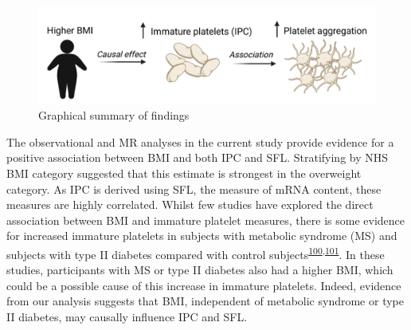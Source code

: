 \documentclass[11pt,twoside]{bristolthesis}
\begin{document}
\begin{figure}
\includegraphics[width=0.9\linewidth]{figure/BMI_platelets/Visual_abstract} \caption{Graphical summary of findings}\label{fig:BMI-platelet-cartoon}
\end{figure}
The observational and MR analyses in the current study provide evidence for a positive association between BMI and both IPC and SFL. Stratifying by NHS BMI category suggested that this estimate is strongest in the overweight category. As IPC is derived using SFL, the measure of mRNA content, these measures are highly correlated. Whilst few studies have explored the direct association between BMI and immature platelet measures, there is some evidence for increased immature platelets in subjects with metabolic syndrome (MS) and subjects with type II diabetes compared with control subjects\textsuperscript{\protect\hyperlink{ref-Vaduganathan2008a}{100},\protect\hyperlink{ref-Mijovic2015a}{101}}. In these studies, participants with MS or type II diabetes also had a higher BMI, which could be a possible cause of this increase in immature platelets. Indeed, evidence from our analysis suggests that BMI, independent of metabolic syndrome or type II diabetes, may causally influence IPC and SFL.
\end{document}
